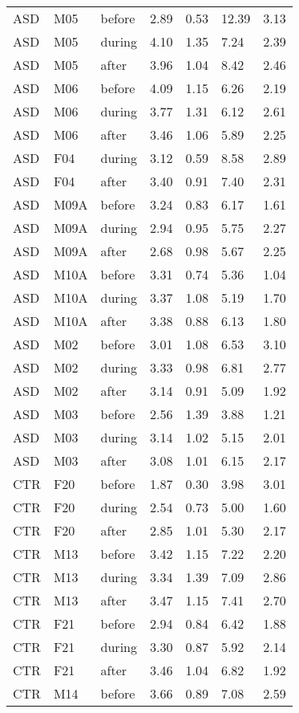 \begin{longtable}{lllllll}
ASD & M05 & before & 2.89 & 0.53 & 12.39 & 3.13\\
ASD & M05 & during & 4.10 & 1.35 & 7.24 & 2.39\\
ASD & M05 & after & 3.96 & 1.04 & 8.42 & 2.46\\
ASD & M06 & before & 4.09 & 1.15 & 6.26 & 2.19\\
ASD & M06 & during & 3.77 & 1.31 & 6.12 & 2.61\\
ASD & M06 & after & 3.46 & 1.06 & 5.89 & 2.25\\
ASD & F04 & during & 3.12 & 0.59 & 8.58 & 2.89\\
ASD & F04 & after & 3.40 & 0.91 & 7.40 & 2.31\\
ASD & M09A & before & 3.24 & 0.83 & 6.17 & 1.61\\
ASD & M09A & during & 2.94 & 0.95 & 5.75 & 2.27\\
ASD & M09A & after & 2.68 & 0.98 & 5.67 & 2.25\\
ASD & M10A & before & 3.31 & 0.74 & 5.36 & 1.04\\
ASD & M10A & during & 3.37 & 1.08 & 5.19 & 1.70\\
ASD & M10A & after & 3.38 & 0.88 & 6.13 & 1.80\\
ASD & M02 & before & 3.01 & 1.08 & 6.53 & 3.10\\
ASD & M02 & during & 3.33 & 0.98 & 6.81 & 2.77\\
ASD & M02 & after & 3.14 & 0.91 & 5.09 & 1.92\\
ASD & M03 & before & 2.56 & 1.39 & 3.88 & 1.21\\
ASD & M03 & during & 3.14 & 1.02 & 5.15 & 2.01\\
ASD & M03 & after & 3.08 & 1.01 & 6.15 & 2.17\\
CTR & F20 & before & 1.87 & 0.30 & 3.98 & 3.01\\
CTR & F20 & during & 2.54 & 0.73 & 5.00 & 1.60\\
CTR & F20 & after & 2.85 & 1.01 & 5.30 & 2.17\\
CTR & M13 & before & 3.42 & 1.15 & 7.22 & 2.20\\
CTR & M13 & during & 3.34 & 1.39 & 7.09 & 2.86\\
CTR & M13 & after & 3.47 & 1.15 & 7.41 & 2.70\\
CTR & F21 & before & 2.94 & 0.84 & 6.42 & 1.88\\
CTR & F21 & during & 3.30 & 0.87 & 5.92 & 2.14\\
CTR & F21 & after & 3.46 & 1.04 & 6.82 & 1.92\\
CTR & M14 & before & 3.66 & 0.89 & 7.08 & 2.59\\

\end{longtable}
